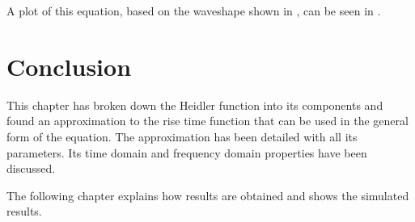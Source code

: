 A plot of this equation, based on the waveshape shown in , can be seen in .

\section{Conclusion}
\label{sec:approx_conclusion}
This chapter has broken down the Heidler function into its components and found an approximation to the rise time function that can be used in the general form of the equation. The approximation has been detailed with all its parameters. Its time domain and frequency domain properties have been discussed.

The following chapter explains how results are obtained and shows the simulated results.
